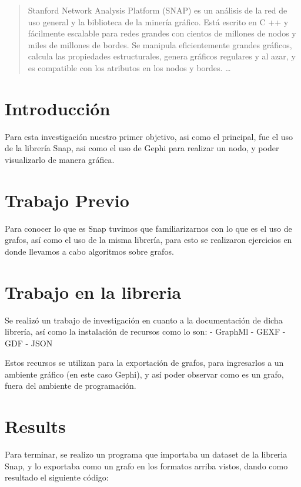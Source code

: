 \documentclass[12pt]{article}
\begin{document}
\maketitle

\begin{abstract}
Stanford Network Analysis Platform (SNAP) es un análisis de la red de uso general y la biblioteca de la minería gráfico. Está escrito en C ++ y fácilmente escalable para redes grandes con cientos de millones de nodos y miles de millones de bordes. Se manipula eficientemente grandes gráficos, calcula las propiedades estructurales, genera gráficos regulares y al azar, y es compatible con los atributos en los nodos y bordes. \ldots
\end{abstract}

\section{Introducción}
Para esta investigación nuestro primer objetivo, asi como el principal, fue el uso de la librería Snap, asi como el uso de Gephi para realizar un nodo, y poder visualizarlo de manera gráfica.

\section{Trabajo Previo}\label{trabajo previo}
Para conocer lo que es Snap tuvimos que familiarizarnos con lo que es el uso de grafos, así como el uso de la misma librería, para esto se realizaron ejercicios en donde llevamos a cabo algoritmos sobre grafos.

\section{Trabajo en la libreria}\label{trabajo}
Se realizó un trabajo de investigación en cuanto a la documentación de dicha librería, así como la instalación de recursos como lo son:
 - GraphMl
 - GEXF
 - GDF
 - JSON

Estos recursos se utilizan para la exportación de grafos, para ingresarlos a un ambiente gráfico (en este caso Gephi), y así poder observar como es un grafo, fuera del ambiente de programación.

\section{Results}\label{results}
Para terminar, se realizo un programa que importaba un dataset de la libreria Snap, y lo exportaba como un grafo en los formatos arriba vistos, dando como resultado el siguiente código:
\end{document}

